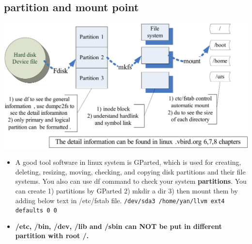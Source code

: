 \documentclass[a4paper,11pt,twoside]{book}
\begin{document}
\subsection{partition and mount point}
	\includegraphics[scale=0.8]{pics/basic_file_system_clip}
\begin{itemize} 
		\item A good tool software in linux system is GParted, which  is used for creating, deleting, resizing, moving, checking, and copying disk partitions and their file systems.  You also can use df command to check your system \textbf{partitions}. You can create 1) partitions by GParted 2) mkdir a dir 3) then mount them by adding below text in /etc/fstab file. \verb=/dev/sda3 /home/yan/llvm ext4 defaults 0 0=
   
		\item \textbf{/etc, /bin, /dev, /lib and /sbin can NOT be put in different partition with root /. }  
\end{itemize}
\end{document}
